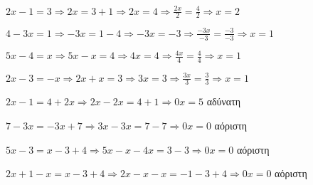 
\begin{alist}
\item $ 2x-1=3\Rightarrow 2x=3+1\Rightarrow 2x=4\Rightarrow \frac{2x}{2}=\frac{4}{2}\Rightarrow x=2 $
\item $ 4-3x=1\Rightarrow -3x=1-4\Rightarrow -3x=-3\Rightarrow \frac{-3x}{-3}=\frac{-3}{-3}\Rightarrow x=1 $
\item $ 5x-4=x\Rightarrow 5x-x=4\Rightarrow 4x=4\Rightarrow \frac{4x}{4}=\frac{4}{4}\Rightarrow x=1 $
\item $ 2x-3=-x\Rightarrow 2x+x=3\Rightarrow 3x=3\Rightarrow \frac{3x}{3}=\frac{3}{3}\Rightarrow x=1 $
\end{alist}

\begin{alist}
\item $ 2x-1=4+2x\Rightarrow 2x-2x=4+1\Rightarrow 0x=5 $ αδύνατη
\item $ 7-3x=-3x+7\Rightarrow 3x-3x=7-7\Rightarrow 0x=0 $ αόριστη
\item $ 5x-3=x-3+4\Rightarrow 5x-x-4x=3-3\Rightarrow 0x=0 $ αόριστη
\item $ 2x+1-x=x-3+4\Rightarrow 2x-x-x=-1-3+4\Rightarrow 0x=0 $ αόριστη
\end{alist}

